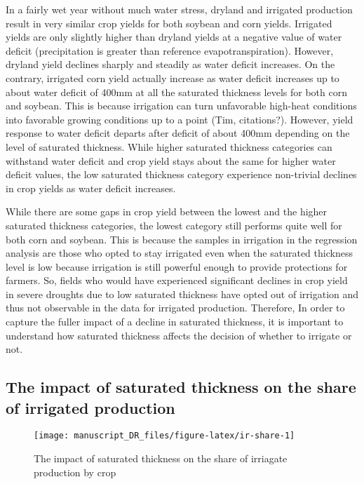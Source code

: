 \documentclass[
]{article}
\begin{document}
In a fairly wet year without much water stress, dryland and irrigated production result in very similar crop yields for both soybean and corn yields. Irrigated yields are only slightly higher than dryland yields at a negative value of water deficit (precipitation is greater than reference evapotranspiration). However, dryland yield declines sharply and steadily as water deficit increases. On the contrary, irrigated corn yield actually increase as water deficit increases up to about water deficit of 400mm at all the saturated thickness levels for both corn and soybean. This is because irrigation can turn unfavorable high-heat conditions into favorable growing conditions up to a point (Tim, citations?). However, yield response to water deficit departs after deficit of about 400mm depending on the level of saturated thickness. While higher saturated thickness categories can withstand water deficit and crop yield stays about the same for higher water deficit values, the low saturated thickness category experience non-trivial declines in crop yields as water deficit increases.

While there are some gaps in crop yield between the lowest and the higher saturated thickness categories, the lowest category still performs quite well for both corn and soybean. This is because the samples in irrigation in the regression analysis are those who opted to stay irrigated even when the saturated thickness level is low because irrigation is still powerful enough to provide protections for farmers. So, fields who would have experienced significant declines in crop yield in severe droughts due to low saturated thickness have opted out of irrigation and thus not observable in the data for irrigated production. Therefore, In order to capture the fuller impact of a decline in saturated thickness, it is important to understand how saturated thickness affects the decision of whether to irrigate or not.

\hypertarget{the-impact-of-saturated-thickness-on-the-share-of-irrigated-production}{%
\subsection{The impact of saturated thickness on the share of irrigated production}\label{the-impact-of-saturated-thickness-on-the-share-of-irrigated-production}}

\begin{figure}

{\centering \texttt{[image: manuscript\_DR\_files/figure-latex/ir-share-1]} 

}

\caption{The impact of saturated thickness on the share of irriagate production by crop }\label{fig:ir-share}
\end{figure}
\end{document}
